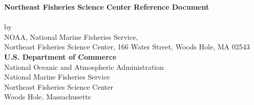 \begin{titlingpage}
\begin{center}
\Large \crdfontfamily 
{\large  \textbf{Northeast Fisheries Science Center Reference Document \crdnumber}}\\
\vspace*{\fill}
{\LARGE \textbf{\crdtitle}} \\
\vspace*{11ex}
by \crdauthors\\[3ex]
{\normalsize NOAA, National Marine Fisheries Service,\\
Northeast Fisheries Science Center, 166 Water Street, Woods Hole, MA 02543}\\[20ex]
\textbf{U.S. Department of Commerce}\\
National Oceanic and Atmospheric Administration\\
National Marine Fisheries Service\\
Northeast Fisheries Science Center\\
Woods Hole, Massachusetts\\
\vspace*{\fill}
\crddate
\end{center}
\end{titlingpage}
